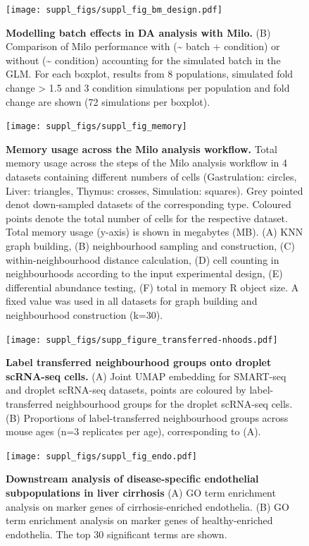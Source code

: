 \documentclass[
]{article}
\begin{document}
\begin{figure}
\centering
\texttt{[image: suppl\_figs/suppl\_fig\_bm\_design.pdf]}
\caption{\label{fig:sup-fig-bm-design}\textbf{Modelling batch effects in DA analysis with Milo.} (B) Comparison of Milo performance with (\textasciitilde{} batch + condition) or without (\textasciitilde{} condition) accounting for the simulated batch in the GLM. For each boxplot, results from 8 populations, simulated fold change \textgreater{} 1.5 and 3 condition simulations per population and fold change are shown (72 simulations per boxplot).}
\end{figure}



\begin{figure}
\texttt{[image: suppl\_figs/suppl\_fig\_memory]} \caption{\textbf{Memory usage across the Milo analysis workflow.}
Total memory usage across the steps of the Milo analysis workflow in 4 datasets containing different numbers of cells (Gastrulation: circles, Liver: triangles, Thymus: crosses, Simulation: squares). Grey pointed denot down-sampled datasets of the corresponding type. Coloured points denote the total number of cells for the respective dataset. Total memory usage (y-axis) is shown in megabytes (MB). (A) KNN graph building, (B) neighbourhood sampling and construction, (C) within-neighbourhood distance calculation, (D) cell counting in neighbourhoods according to the input experimental design, (E) differential abundance testing, (F) total in memory R object size. A fixed value was used in all datasets for graph building and neighbourhood construction (k=30).}\label{fig:sup-fig-scalability}
\end{figure}




\begin{figure}
\centering
\texttt{[image: suppl\_figs/supp\_figure\_transferred-nhoods.pdf]}
\caption{\label{fig:sup-fig-thymus-nhoods}\textbf{Label transferred neighbourhood groups onto droplet scRNA-seq cells.} (A) Joint UMAP embedding for SMART-seq and droplet scRNA-seq datasets, points are coloured by label-transferred neighbourhood groups for the droplet scRNA-seq cells. (B) Proportions of label-transferred neighbourhood groups across mouse ages (n=3 replicates per age), corresponding to (A).}
\end{figure}



\begin{figure}
\centering
\texttt{[image: suppl\_figs/suppl\_fig\_endo.pdf]}
\caption{\label{fig:sup-fig-liver-endo}\textbf{Downstream analysis of disease-specific endothelial subpopulations in liver cirrhosis}
(A) GO term enrichment analysis on marker genes of cirrhosis-enriched endothelia. (B) GO term enrichment analysis on marker genes of healthy-enriched endothelia. The top 30 significant terms are shown.}
\end{figure}
\end{document}
